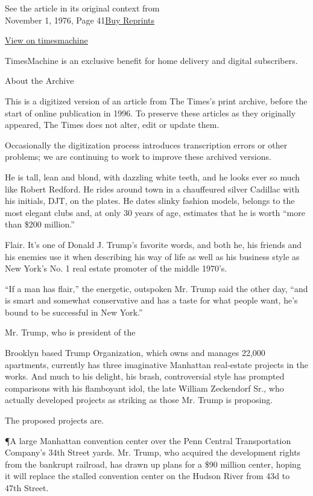 See the article in its original context from\\
November 1, 1976, Page
41\href{https://store.nytimes.com/collections/new-york-times-page-reprints?utm_source=nytimes\&utm_medium=article-page\&utm_campaign=reprints}{Buy
Reprints}

\href{http://timesmachine.nytimes.com/timesmachine/1976/11/01/75642708.html}{View
on timesmachine}

TimesMachine is an exclusive benefit for home delivery and digital
subscribers.

About the Archive

This is a digitized version of an article from The Times's print
archive, before the start of online publication in 1996. To preserve
these articles as they originally appeared, The Times does not alter,
edit or update them.

Occasionally the digitization process introduces transcription errors or
other problems; we are continuing to work to improve these archived
versions.

He is tall, lean and blond, with dazzling white teeth, and he looks ever
so much like Robert Redford. He rides around town in a chauffeured
silver Cadillac with his initials, DJT, on the plates. He dates slinky
fashion models, belongs to the most elegant clubs and, at only 30 years
of age, estimates that he is worth ``more than \$200 million.''

Flair. It's one of Donald J. Trump's favorite words, and both he, his
friends and his enemies use it when describing his way of life as well
as his business style as New York's No. 1 real estate promoter of the
middle 1970's.

``If a man has flair,'' the energetic, outspoken Mr. Trump said the
other day, ``and is smart and somewhat conservative and has a taste for
what people want, he's bound to be successful in New York.''

Mr. Trump, who is president of the

Brooklyn based Trump Organization, which owns and manages 22,000
apartments, currently has three imaginative Manhattan real‐estate
projects in the works. And much to his delight, his brash, controversial
style has prompted comparisons with his flamboyant idol, the late
William Zeckendorf Sr., who actually developed projects as striking as
those Mr. Trump is proposing.

The proposed projects are.

¶A large Manhattan convention center over the Penn Central
Transportation Company's 34th Street yards. Mr. Trump, who acquired the
development rights from the bankrupt railroad, has drawn up plans for a
\$90 million center, hoping it will replace the stalled convention
center on the Hudson River from 43d to 47th Street.

